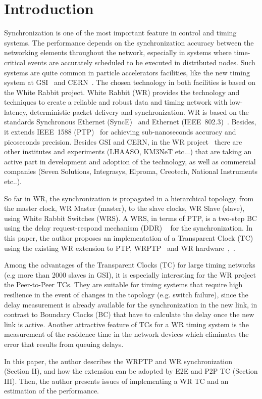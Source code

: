 \section{Introduction}

Synchronization is one of the most important feature in control and timing
systems. The performance depends on the synchronization accuracy between 
the networking elements throughout the network, especially in systems 
where time-critical events are accurately scheduled to be executed in
distributed nodes. Such systems are quite common in particle accelerators
facilities, like the new timing system at GSI~\cite{biblio:FAIRtimingSystem} and 
CERN~\cite{biblio:cernWr}. The chosen technology  in both facilities is based on
the White Rabbit project. White Rabbit (WR) provides the technology and techniques to create a 
reliable and robust data and timing network with low-latency, deterministic packet 
delivery and synchronization. WR is based on the standards Synchronous Ethernet 
(SyncE)~\cite{biblio:synch} and  Ethernet (IEEE~802.3)~\cite{biblio:ethernet}. Besides, it extends IEEE~1588 
(PTP)~\cite{biblio:ptp} for achieving sub-nanoseconds  accuracy and picoseconds precision.
Besides GSI and CERN, in the WR project~\cite{biblio:wrproj} there are other 
institutes and experiments (LHAASO, KM3NeT etc...) that are taking an active part in 
development and adoption of the technology, as well as commercial companies (Seven Solutions, 
Integrasys, Elproma, Creotech, National Instruments etc..).

So far in WR, the synchronization is propagated in a hierarchical topology, from the master clock, 
WR Master (master), to the slave clocks, WR Slave (slave), using White Rabbit Switches (WRS). 
A WRS, in terms of PTP, is a two-step BC using the delay request-respond
mechanism (DDR) ~\cite{biblio:ptp}  
for the synchronization. In this paper, the author proposes an implementation
of a Transparent Clock (TC) using the existing WR extension to PTP, WRPTP~\cite{biblio:wrptp} 
and WR hardware~\cite{biblio:spec},~\cite{biblio:wrswitch}. 

Among the advantages of the Transparent Clocks (TC) for large timing networks
(e.g more than 2000 slaves in GSI), it is especially interesting
for the WR project the Peer-to-Peer TCs. They are suitable for timing
systems that require high resilience in the event of changes in the topology 
(e.g. switch failure), since the delay measurement is already available for
the synchronization in the new link, in contrast to Boundary Clocks (BC) that
have to calculate the delay once the new link is active. Another attractive feature 
of TCs for a WR timing system is the measurement of the residence time in the network 
devices which eliminates the error that results from queuing delays. 

In this paper, the author describes the WRPTP and WR synchronization (Section
II), and how the extension can be adopted by E2E and P2P TC (Section III). Then,
the author presents issues of implementing a WR TC  and an estimation of the performance.




